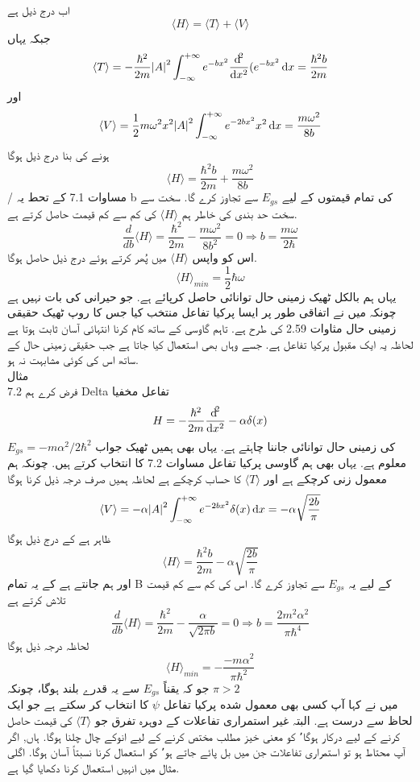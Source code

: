 \documentclass{book}
\begin{document}
اب درج ذیل ہے
 \[ \langle H \rangle=\langle T \rangle + \langle V \rangle\]
جبکہ یہاں
\[\langle T \rangle=-\frac{\hbar^{2}}{2m}\abs{A}^{2}\int_{-\infty}^{+\infty}e^{-bx^{2}}\frac{\dif^{2}}{\dif{x^{2}}}(e^{-bx^{2}}\dif{x}=\frac{\hbar^{2}b}{2m}\]
اور
\[\langle V\rangle=\frac{1}{2}m\omega^{2}x^{2}\abs{A}^{2}\int_{-\infty}^{+\infty}e^{-2bx^{2}}x^{2}\dif{x}=\frac{m\omega^{2}}{8b}\]
ہونے کی بنا درج ذیل ہوگا
\[ \langle H \rangle=\frac{\hbar^{2}b}{2m}+\frac{m\omega^{2}}{8b}\]
/
مساوات 7.1 کے تحط یہ b کی تمام قیمتوں کے لیے
\(E_{gs}\)
 سے تجاوز کرے گا. سخت سے سخت حد بندی کی خاطر ہم
 \( \langle H\rangle\)
 کی کم سے کم قیمت حاصل کرتے ہے.
\[\frac{d}{db}\langle H\rangle=\frac{\hbar^{2}}{2m}-\frac{m\omega^{2}}{8b^{2}}=0\Rightarrow b=\frac{m\omega}{2\hbar}\]
اس کو واپس
 \( \langle H\rangle \)
میں پُھر کرتے ہوئے درج ذیل حاصل ہوگا.
 \[\langle H\rangle _{min} =\frac{1}{2}\hbar\omega\]
یہاں ہم بالکل ٹھیک زمینی حال توانائی حاصل کرپائے ہے. جو حیرانی کی بات نہیں ہے چونکہ میں نے اتفاقی طور پر ایسا پرکیا تفاعل منتخب کیا جس کا روپ ٹھیک حقیقی  زمینی حال مثاوات 2.59 کی طرح ہے.   تاہم گاوسی کے ساتھ کام کرنا انتہائی آسان ثابت ہوتا ہے لحاظہ یہ ایک مقبول پرکیا تفاعل ہے. جسے وہاں بھی استعمال کیا جاتا ہے جب حقیقی زمینی حال کے ساتھ اس کی کوئی مشابہت نہ ہو.\\
مثال \\7.2
فرض کرے ہم Delta تفاعل مخفیا
\[H=-\frac{\hbar^{2}}{2m}\frac{\dif^{2}}{\dif{x^{2}}}-\alpha\delta(x)\]
کی زمینی حال توانائی جاننا چاہتے ہے. یہاں بھی ہمیں ٹھیک جواب
\(E_{gs}=-m\alpha^{2}/2\hbar^{2}\)
معلوم ہے. یہاں بھی ہم گاوسی پرکیا تفاعل مساوات 7.2 کا انتخاب کرتے ہیں. چونکہ ہم معمول زنی کرچکے ہے اور  
\(\langle T\rangle\)
 کا حساب کرچکے ہے لحاظہ ہمیں صرف درجہ ذیل کرنا ہوگا
\[\langle V\rangle=-\alpha\abs{A}^{2}\int_{-\infty}^{+\infty}e^{-2bx^{2}}\delta(x)\dif{x}=-\alpha\sqrt{\frac{2b}{\pi}}\]
ظاہر ہے کے درج ذيل ہوگا
 \[\langle H\rangle=\frac{\hbar^{2}b}{2m}-\alpha\sqrt{\frac{2b}{\pi}}\]
اور ہم جانتے ہے کے یہ تمام B  کے لیے یہ
\( E_{gs}\)
 سے تجاوز کرے گا. اس کی کم سے كم قیمت تلاش کرتے ہے\\
\[\frac{d}{db}\langle H\rangle=\frac{\hbar^{2}}{2m}-\frac{\alpha}{\sqrt{2\pi b}}=0\Rightarrow b=\frac{2m^{2}\alpha^{2}}{\pi\hbar^{4}}\]
لحاظہ درجہ ذیل ہوگا 
 \[\langle H\rangle _{min} =-\frac{-m\alpha^{2}}{\pi\hbar^{2}}\]
جو کہ یقناً
\( E_{gs}\)
 سے یہ قدرے بلند ہوگا، چونکہ
\(\pi>2\) \\
میں نے کہا آپ کسی بھی معمول شده پرکیا تفاعل 
\(\psi\) 
کا انتخاب کر سکتے ہے جو ایک لحاظ سے درست ہے. البتہ غیر استمراری تفاعلات کے دوہرہ تفرق جو
\( \langle T \rangle\)
کی قیمت حاصل کرنے کے لیے درکار ہوگا٬ کو معنی خیز مطلب مختص کرنے کے لیے انوکے چال چلنا ہوگا. ہاں, اگر آپ محتاط ہو تو استمراری تفاعلات جن میں بل پائے جاتے ہو٬ کو استعمال کرنا نسبتاً آسان ہوگا. اگلی مثال میں انہیں استعمال کرنا دکھایا گیا ہے.\\
\end{document}
